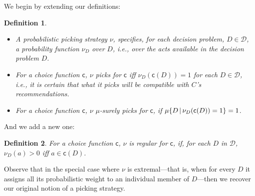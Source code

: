 \documentclass[a4paper]{article}
\newtheorem{definition}{Definition}
\newcommand\A{\mathcal{A}}
\newcommand\D{\mathcal{D}}
\newcommand\s{\mathsf{s}}
\renewcommand\P{\mathbb{P}} %
\renewcommand\c{\mathsf{c}} %
\newcommand\EU{\mathrm{EU}}
\newcommand\REU{\mathrm{REU}}
\newcommand\EAd{\mathrm{EAd}}
\newcommand\Maximin{\Gamma}
\newcommand{\IP}{\P}
\newcommand{\todoinfo}[2][]{\todo[backgroundcolor=orange!80,bordercolor=black,linecolor=gray!80, #1,inline,caption={}]{#2}}
\newcommand\SetDelimiter[1][]{
	\nonscript\,#1\vert \allowbreak \nonscript\,\mathopen{}}
\providecommand\given{\SetDelimiter}
\renewcommand{\emptyset}{\varnothing}
\newenvironment{CCM rewritten}
{\begingroup\color{blue}} %
{\endgroup}              %
\begin{document}
We begin by extending our definitions:
\begin{definition}\label{def:nu stuff}\ 
	\begin{itemize}
		\item %
		A \emph{probabilistic picking strategy} $\nu$, specifies, for each decision problem, $D\in\D$, a probability function $\nu_D$ over $D$, i.e., over the acts available in the decision problem $D$.
		\item For a choice function $\c$,  $\nu$ \emph{picks for $\c$} iff $\nu_D(\c(D))=1$ for each $D\in\D$, i.e., it is certain that what it picks will be compatible with $C$'s recommendations.
		\item For a choice function $\c$, $\nu$ \emph{$\mu$-surely picks for $\c$}, if $\mu\{D\given \nu_D(\c(D))=1\}=1$.
 	\end{itemize}
\end{definition}
And we add a new one:
\begin{definition}
For a choice function $\c$,  \emph{$\nu$ is regular for $\c$}, if, for each $D$ in $\D$, $\nu_D(a) > 0$ iff $a \in \c(D)$.
\end{definition}
Observe that in the special case where $\nu$ is extremal---that is, when for every $D$ it assigns all its probabilistic weight to an individual member of $D$---then we recover our original notion of a picking strategy. 

\end{document}
